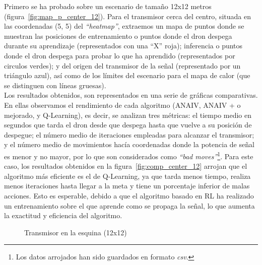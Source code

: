 Primero se ha probado sobre un escenario de tamaño 12x12 metros (figura~\ref{fig:map_p_center_12}). Para el transmisor cerca del centro, situada en las coordenadas (5, 5) del \emph{``heatmap''}, extraemos un mapa de puntos donde se muestran las posiciones de entrenamiento o puntos donde el dron despega durante su aprendizaje (representados con una ``X'' roja); inferencia o puntos donde el dron despega para probar lo que ha aprendido (representados por circulos verdes); y del origen del transmisor de la señal (representado por un triángulo azul), así como de los límites del escenario para el mapa de calor (que se distinguen con líneas gruesas).\\

Los resultados obtenidos, son representados en una serie de gráficas comparativas. En ellas observamos el rendimiento de cada algoritmo (\ac{ANAIV}, \ac{ANAIV} + o mejorado, y Q-Learning), es decir, se analizan tres métricas: el tiempo medio en segundos que tarda el dron desde que despega hasta que vuelve a su posición de despegue; el número medio de iteraciones empleadas para alcanzar el transmisor; y el número medio de movimientos hacía coordenadas donde la potencia de señal es menor y no mayor, por lo que son considerados como \emph{``bad moves''}\footnote[6]{Los datos arrojados han sido guardados en formato \emph{csv}.}. Para este caso, los resultados obtenidos en la figura~\ref{fig:comp_center_12} arrojan que el algoritmo más eficiente es el de Q-Learning, ya que tarda menos tiempo, realiza menos iteraciones hasta llegar a la meta y tiene un porcentaje inferior de malas acciones. Esto es esperable, debido a que el algoritmo basado en \ac{RL} ha realizado un entrenamiento sobre el que aprende como se propaga la señal, lo que aumenta la exactitud y eficiencia del algoritmo.\\

\begin{figure} [tp]
	\centering
	\quad
	\caption{Transmisor en la esquina (12x12)}
	\label{fig:map_p_esq_12}
\end{figure}


